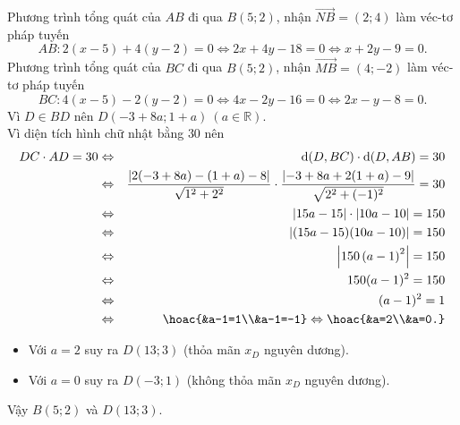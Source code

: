 \begin{bt}
{Phương trình tổng quát của $AB$ đi qua $B(5;2)$, nhận $\vec{NB}=(2;4)$ làm véc-tơ pháp tuyến
\[AB\colon 2(x-5)+4(y-2)=0\Leftrightarrow 2x+4y-18=0\Leftrightarrow x+2y-9=0. \]
Phương trình tổng quát của $BC$ đi qua $B(5;2)$, nhận $\vec{MB}=(4;-2)$ làm véc-tơ pháp tuyến
\[BC\colon 4(x-5)-2(y-2)=0\Leftrightarrow 4x-2y-16=0\Leftrightarrow 2x-y-8=0. \]
Vì $D\in BD$ nên $D(-3+8a;1+a)\ (a\in\mathbb{R})$.\\
Vì diện tích hình chữ nhật bằng $30$ nên
\allowdisplaybreaks
\begin{eqnarray*}
DC\cdot AD=30&\Leftrightarrow &\mathrm{d}(D,BC)\cdot \mathrm{d}(D,AB)=30\\
&\Leftrightarrow &\dfrac{\left|2(-3+8a)-(1+a)-8\right|}{\sqrt{1^2+2^2}}\cdot\dfrac{\left|-3+8a+2(1+a)-9\right|}{\sqrt{2^2+(-1)^2}}=30\\
&\Leftrightarrow &\left|15a-15\right|\cdot\left|10a-10\right|=150\\
&\Leftrightarrow &\left|(15a-15)(10a-10)\right|=150\\
&\Leftrightarrow &\left|150\left(a-1\right)^2\right|=150\\
&\Leftrightarrow &150(a-1)^2=150\\
&\Leftrightarrow &(a-1)^2=1\\
&\Leftrightarrow &\hoac{&a-1=1\\&a-1=-1}\Leftrightarrow\hoac{&a=2\\&a=0.}
\end{eqnarray*}
\begin{itemize}
	\item Với $a=2$ suy ra $D(13;3)$ (thỏa mãn $x_D$ nguyên dương).
	\item Với $a=0$ suy ra $D(-3;1)$ (không thỏa mãn $x_D$ nguyên dương).
\end{itemize}
Vậy $B(5;2)$ và $D(13;3)$.
}
\end{bt}

